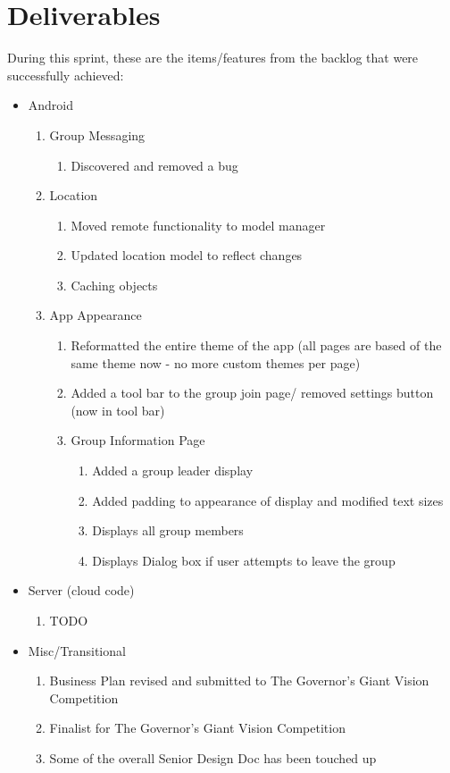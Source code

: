 \documentclass[11pt]{article}
\begin{document}
\section*{Deliverables}
During this sprint, these are the items/features from the backlog that were successfully achieved:
	\begin{itemize}
	\item Android
		\begin{enumerate}
		\item Group Messaging
			\begin{enumerate}
			\item Discovered and removed a bug
			\end{enumerate}
		\item Location
			\begin{enumerate}
			\item Moved remote functionality to model manager
			\item Updated location model to reflect changes
			\item Caching objects
			\end{enumerate}
		\item App Appearance
			\begin{enumerate}
			\item Reformatted the entire theme of the app (all pages are based of the same theme now - no more custom themes per page)
			\item Added a tool bar to the group join page/ removed settings button (now in tool bar)
			\item Group Information Page
				\begin{enumerate}
				\item Added a group leader display
				\item Added padding to appearance of display and modified text sizes
				\item Displays all group members
				\item Displays Dialog box if user attempts to leave the group
				\end{enumerate}
			\end{enumerate}
		\end{enumerate}

	\item Server (cloud code)
		\begin{enumerate}
			\item TODO
		\end{enumerate}
		
	\item Misc/Transitional
		\begin{enumerate}
			\item Business Plan revised and submitted to The Governor's Giant Vision Competition
			\item Finalist for The Governor's Giant Vision Competition
			\item Some of the overall Senior Design Doc has been touched up
		\end{enumerate}

	\end{itemize}
\end{document}
